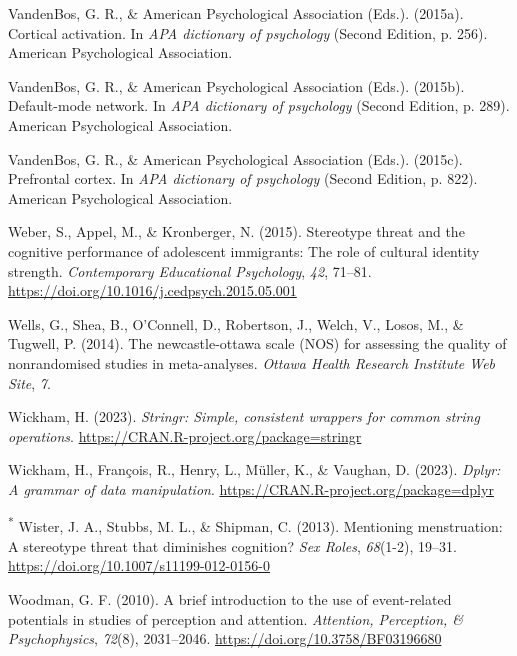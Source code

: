 \documentclass[
  stu, a4paper,floatsintext]{apa7}
\newlength{\cslhangindent}
\newenvironment{CSLReferences}[2] %
 {\begin{list}{}{%
  \setlength{\itemindent}{0pt}
  \setlength{\leftmargin}{0pt}
  \setlength{\parsep}{0pt}
  \ifodd #1
   \setlength{\leftmargin}{\cslhangindent}
   \setlength{\itemindent}{-1\cslhangindent}
  \fi
  \setlength{\itemsep}{#2\baselineskip}}}
 {\end{list}}
\begin{document}
\begin{CSLReferences}{1}{0}
VandenBos, G. R., \& American Psychological Association (Eds.). (2015a). Cortical activation. In \emph{{APA} dictionary of psychology} (Second Edition, p. 256). American Psychological Association.

VandenBos, G. R., \& American Psychological Association (Eds.). (2015b). Default-mode network. In \emph{{APA} dictionary of psychology} (Second Edition, p. 289). American Psychological Association.

VandenBos, G. R., \& American Psychological Association (Eds.). (2015c). Prefrontal cortex. In \emph{{APA} dictionary of psychology} (Second Edition, p. 822). American Psychological Association.

Weber, S., Appel, M., \& Kronberger, N. (2015). Stereotype threat and the cognitive performance of adolescent immigrants: {The} role of cultural identity strength. \emph{Contemporary Educational Psychology}, \emph{42}, 71--81. \url{https://doi.org/10.1016/j.cedpsych.2015.05.001}

Wells, G., Shea, B., O'Connell, D., Robertson, J., Welch, V., Losos, M., \& Tugwell, P. (2014). The newcastle-ottawa scale ({NOS}) for assessing the quality of nonrandomised studies in meta-analyses. \emph{Ottawa Health Research Institute Web Site}, \emph{7}.

Wickham, H. (2023). \emph{Stringr: Simple, consistent wrappers for common string operations}. \url{https://CRAN.R-project.org/package=stringr}

Wickham, H., François, R., Henry, L., Müller, K., \& Vaughan, D. (2023). \emph{Dplyr: A grammar of data manipulation}. \url{https://CRAN.R-project.org/package=dplyr}

\textsuperscript{*} Wister, J. A., Stubbs, M. L., \& Shipman, C. (2013). Mentioning menstruation: A stereotype threat that diminishes cognition? \emph{Sex Roles}, \emph{68}(1-2), 19--31. \url{https://doi.org/10.1007/s11199-012-0156-0}

Woodman, G. F. (2010). A brief introduction to the use of event-related potentials in studies of perception and attention. \emph{Attention, Perception, \& Psychophysics}, \emph{72}(8), 2031--2046. \url{https://doi.org/10.3758/BF03196680}


\end{CSLReferences}
\end{document}
